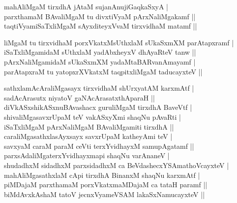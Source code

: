 \begin{entry}
\begin{shl}
mahAliMgaM tirxdhA jAtaM sujanAnujiGaqkaSxyA |\\
parxthamaM BAvaliMgaM tu divxtiVyaM pArxNaliMgakamf ||\\
taqtiVyamiSaTxliMgaM sAyxditeyxVvaM tirxvidhaM matamf ||
\end{shl}
\begin{shl}
liMgaM tu tirxvidhaM porxVkatxMsUthxlaM sUkaSxmXM parAtapxramf |\\
iSaTxliMgamidaM sUthxlaM yadAbxheyxV dhAyaRteV tanw ||\\
pArxNaliMgamidaM sUkaSxmXM yadaMtaBARvanAmayamf |\\
parAtapxraM tu yatopxrXVkatxM taqpitxliMgaM taducayxteV ||
\end{shl}
\begin{shl}
sathxlamAcAraliMgasayx tirxvidhaM shUrxyatAM karxmAtf |\\
sadAcArasutx niyatoV gaNAcArasatxthAparaH ||\\
diVkASxshikASxnuBAvashacx guruliMgaM tirxdhA BaveVtf |\\
shivaliMgasavxrUpaM teV vakASxyXmi shaqNu pAvaRti |\\
iSaTxliMgaM pArxNaliMgaM BAvaliMgamiti tirxdhA ||\\
caraliMgasathxlasAyxsayx savxrUpaM katheyAmi teV |\\
savxyaM caraM paraM ceVti terxYvidhayxM samupAgatamf ||\\
parxsAdaliMgaterxYvidhayxmapi shaqNu varAnaneV |\\
shudadhxM sidadhxM parxsidadhxM ca BeVdashecxYSAmathoVcayxteV |\\
mahAliMgasathxlaM cApi tirxdhA BinanxM shaqNu karxmAtf |\\
piMDajaM parxthamaM porxVkatxmaMDajaM ca tataH paramf ||\\
biMdAvxkAshaM tatoV jecnxVyameVSAM lakaSxNamucayxteV ||
\end{shl}
\end{entry}

